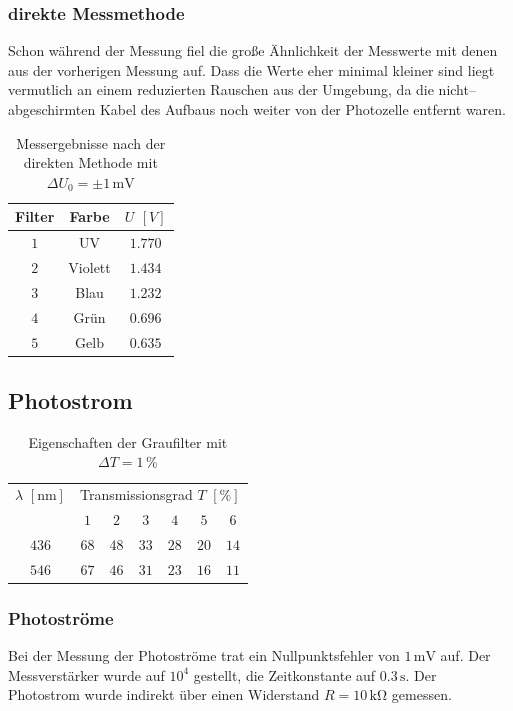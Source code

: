 \documentclass[12pt,a4paper]{scrartcl}
\numberwithin{equation}{section} %
\begin{document}
\subsubsection{direkte Messmethode}
Schon während der Messung fiel die große Ähnlichkeit der Messwerte mit denen aus der vorherigen Messung auf. Dass die Werte eher minimal kleiner sind liegt vermutlich an einem reduzierten Rauschen aus der Umgebung, da die nicht--abgeschirmten Kabel des Aufbaus noch weiter von der Photozelle entfernt waren.

\begin{table}[h!]
	\centering
	\begin{tabular}{c|c|c}
		Filter & Farbe & $U$ $[V]$ \\
		\hline
		$1$ & UV & $1.770$ \\
		$2$ & Violett & $1.434$ \\
		$3$ & Blau & $1.232$ \\
		$4$ & Grün & $0.696$ \\
		$5$ & Gelb & $0.635$ \\
	\end{tabular}
	\caption{Messergebnisse nach der direkten Methode mit $\Delta U_0=\pm 1\mathrm{\,mV}$}
	\label{tab:direkten Methode}
\end{table}

\subsection{Photostrom}
\begin{table}[h!]
	\centering
	\begin{tabular}{c|c|c|c|c|c|c}
		$\lambda$ $[\mathrm{nm}]$ & \multicolumn{6}{c}{Transmissionsgrad $T$ $[\%]$} \\
		& $1$ & $2$ & $3$ & $4$ & $5$ & $6$ \\
		\hline
		$436$ & $68$ & $48$ & $33$ & $28$ & $20$ & $14$ \\
		$546$ & $67$ & $46$ & $31$ & $23$ & $16$ & $11$
	\end{tabular}
	\caption{Eigenschaften der Graufilter mit $\Delta T=1\,\%$}
	\label{tab:Graufilter}
\end{table}

\subsubsection{Photoströme}
Bei der Messung der Photoströme trat ein Nullpunktsfehler von $1\mathrm{\,mV}$ auf. Der Messverstärker wurde auf $10^4$ gestellt, die Zeitkonstante auf $0.3\mathrm{\,s}$. Der Photostrom wurde indirekt über einen Widerstand $R=10\mathrm{\,k\Omega}$ gemessen.
\end{document}
